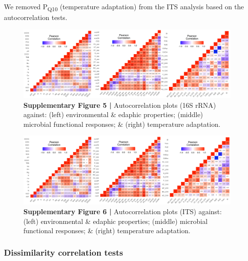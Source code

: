 \documentclass[
  10pt,
  letterpaper,
  DIV=11,
  numbers=noendperiod]{scrartcl}
\begin{document}
We removed P\textsubscript{Q10} (temperature adaptation) from the ITS
analysis based on the autocorrelation tests.

\begin{figure}

{\centering \includegraphics[width=1\textwidth,height=\textheight]{FIGURES/ssu18_auto_cor_combo.png}

}

\caption{\textbf{Supplementary Figure 5 |} Autocorrelation plots (16S
rRNA) against: (left) environmental \& edaphic properties; (middle)
microbial functional responses; \& (right) temperature adaptation.}

\end{figure}

\begin{figure}

{\centering \includegraphics[width=1\textwidth,height=\textheight]{FIGURES/its18_auto_cor_combo.png}

}

\caption{\textbf{Supplementary Figure 6 |} Autocorrelation plots (ITS)
against: (left) environmental \& edaphic properties; (middle) microbial
functional responses; \& (right) temperature adaptation.}

\end{figure}

\hypertarget{dissimilarity-correlation-tests}{%
\subsubsection{Dissimilarity correlation
tests}\label{dissimilarity-correlation-tests}}
\end{document}
